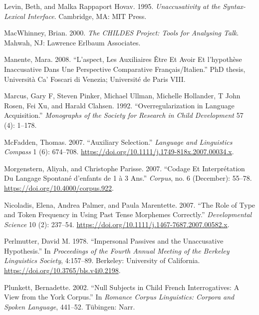 \documentclass[
  12pt,
]{article}
\newlength{\cslhangindent}
\newlength{\cslentryspacingunit} %
\newenvironment{CSLReferences}[2] %
 {%
  \setlength{\parindent}{0pt}
  \ifodd #1
  \let\oldpar\par
  \def\par{\hangindent=\cslhangindent\oldpar}
  \fi
  \setlength{\parskip}{#2\cslentryspacingunit}
 }%
 {}
\begin{document}
\begin{enumerate}[resume*]
\begin{enumerate}[resume*]
\begin{enumerate}[resume*]
\begin{enumerate}[resume*]
\begin{enumerate}[resume*]
\begin{CSLReferences}{1}{0}
\leavevmode{}%
Levin, Beth, and Malka Rappaport Hovav. 1995. \emph{Unaccusativity at the {Syntax}-{Lexical} {Interface}}. Cambridge, MA: MIT Press.

\leavevmode{}%
MacWhinney, Brian. 2000. \emph{The {CHILDES} Project: {Tools} for Analysing Talk}. Mahwah, NJ: Lawrence Erlbaum Associates.

\leavevmode{}%
Manente, Mara. 2008. {``L'aspect, Les Auxiliaires Être Et Avoir Et l'hypothèse Inaccusative Dans Une Perspective Comparative Français/Italien.''} PhD thesis, Università Ca' Foscari di Venezia; Université de Paris VIII.

\leavevmode{}%
Marcus, Gary F, Steven Pinker, Michael Ullman, Michelle Hollander, T John Rosen, Fei Xu, and Harald Clahsen. 1992. {``Overregularization in {Language} {Acquisition}.''} \emph{Monographs of the Society for Research in Child Development} 57 (4): 1--178.

\leavevmode{}%
McFadden, Thomas. 2007. {``Auxiliary {Selection}.''} \emph{Language and Linguistics Compass} 1 (6): 674--708. \url{https://doi.org/10.1111/j.1749-818x.2007.00034.x}.

\leavevmode{}%
Morgenstern, Aliyah, and Christophe Parisse. 2007. {``Codage Et Interprétation Du Langage Spontané d'enfants de 1 à 3 Ans.''} \emph{Corpus}, no. 6 (December): 55--78. \url{https://doi.org/10.4000/corpus.922}.

\leavevmode{}%
Nicoladis, Elena, Andrea Palmer, and Paula Marentette. 2007. {``The Role of Type and Token Frequency in Using Past Tense Morphemes Correctly.''} \emph{Developmental Science} 10 (2): 237--54. \url{https://doi.org/10.1111/j.1467-7687.2007.00582.x}.

\leavevmode{}%
Perlmutter, David M. 1978. {``Impersonal {Passives} and the {Unaccusative} {Hypothesis}.''} In \emph{Proceedings of the {Fourth} {Annual} {Meeting} of the {Berkeley} {Linguistics} {Society}}, 4:157--89. Berkeley: University of California. \url{https://doi.org/10.3765/bls.v4i0.2198}.

\leavevmode{}%
Plunkett, Bernadette. 2002. {``Null Subjects in Child {French} Interrogatives: {A} View from the {York} Corpus.''} In \emph{Romance Corpus Linguistics: {Corpora} and Spoken Language}, 441--52. Tübingen: Narr.


\end{CSLReferences}
\end{enumerate}
\end{enumerate}
\end{enumerate}
\end{enumerate}
\end{enumerate}
\end{document}
